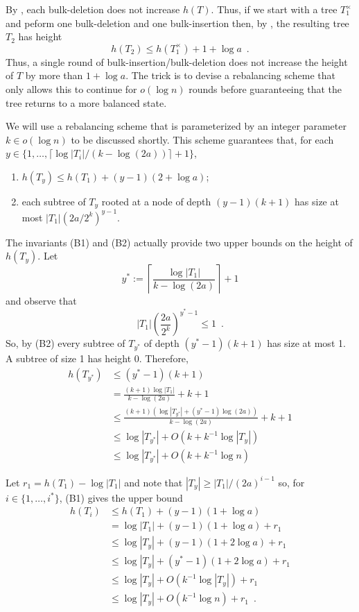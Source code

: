 \documentclass[kpfonts]{patmorin}
\begin{document}
By , each bulk-deletion does not increase $h(T)$.  Thus, if we start with a tree $T_1^\times$ and peform one bulk-deletion and one bulk-insertion then, 
by , the resulting tree $T_2$ has height
\[
   h(T_2) \le h(T_1^\times)+1+\log a \enspace .
\]
Thus, a single round of bulk-insertion/bulk-deletion does not increase the height of $T$ by more than $1+\log a$.  The trick is to devise a rebalancing scheme that only allows this to continue for $o(\log n)$ rounds before guaranteeing that the tree returns to a more balanced state.

We will use a rebalancing scheme that is parameterized by an integer parameter $k\in o(\log n)$ to be discussed shortly.  This scheme guarantees that, for each $y\in\{1,\ldots,\lceil\log|T_i|/(k-\log(2a))\rceil+1\}$, 
\begin{enumerate}[(B1)]
  \item $h(T_y)\le h(T_1) + (y-1)(2+\log a)$;
  \item each subtree of $T_y$ rooted at a node of depth $(y-1)(k+1)$ has size at most $|T_1|(2a/2^k)^{y-1}$.
\end{enumerate}

The invariants (B1) and (B2) actually provide two upper bounds on the height of $h(T_y)$.  Let
\[
   y^* := \left\lceil \frac{\log|T_1|}{k-\log(2a)}\right\rceil + 1
\]
and observe that
\[
   |T_{1}|\left(\frac{2a}{2^k}\right)^{y^*-1} \le 1 \enspace .
\]
So, by (B2) every subtree of $T_{y^*}$ of depth $(y^*-1)(k+1)$ has size at most 1.  A subtree of size 1 has height 0.  Therefore,
\begin{align*}
  h(T_{y^*}) & \le (y^*-1)(k+1) \\
  & = \frac{(k+1)\log|T_1|}{k-\log(2a)} + k+1 \\
  & \le \frac{(k+1)(\log |T_{y^*}| + (y^*-1)\log(2a))}{k-\log(2a)} + k+1 \\
  & \le \log|T_{y^*}| + O(k + k^{-1}\log |T_y|) \\
  & \le \log |T_{y^*}| + O(k + k^{-1}\log n)
\end{align*}

Let $r_1=h(T_1)-\log |T_1|$ and note that $|T_y|\ge |T_1|/(2a)^{i-1}$ so, for $i\in\{1,\ldots,i^*\}$, (B1) gives the upper bound
\begin{align}
     h(T_i) & \le h(T_1) + (y-1)(1+\log a) \nonumber \\
            &= \log|T_1| + (y-1)(1+\log a) + r_1 \nonumber \\
            &\le \log |T_y| + (y-1)(1+2\log a) + r_1 \nonumber \\
            &\le \log |T_y| + (y^*-1)(1+2\log a) + r_1 \nonumber \\
            &\le \log |T_y| + O(k^{-1}\log|T_y|) + r_1 \nonumber \\
            &\le \log |T_y| + O(k^{-1}\log n) + r_1 \enspace .
\end{align}
\end{document}
